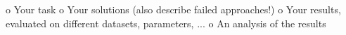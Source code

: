 o Your task
o Your solutions (also describe failed approaches!)
o Your results, evaluated on different datasets, parameters, ...
o An analysis of the results